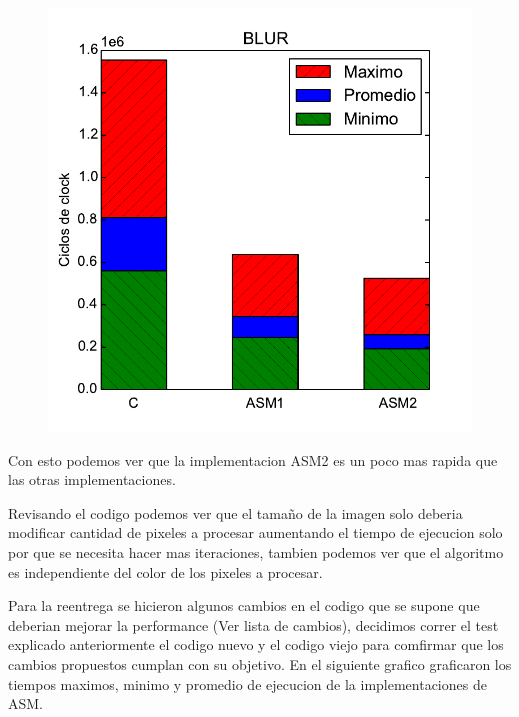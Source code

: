 \begin{figure}[h!]
	\centering
	\includegraphics[scale=0.45]{images/blur_comparation}
\end{figure}

Con esto podemos ver que la implementacion ASM2 es un poco mas rapida que las otras implementaciones.

Revisando el codigo podemos ver que el tamaño de la imagen solo deberia modificar cantidad de pixeles a procesar aumentando el tiempo de ejecucion solo por que se necesita hacer mas iteraciones, tambien podemos ver que el algoritmo es independiente del color de los pixeles a procesar.

Para la reentrega se hicieron algunos cambios en el codigo que se supone que deberian mejorar la performance (Ver lista de cambios), decidimos correr el test explicado anteriormente el codigo nuevo y el codigo viejo para comfirmar que los cambios propuestos cumplan con su objetivo. En el siguiente grafico graficaron los tiempos maximos, minimo y promedio de ejecucion de la implementaciones de ASM.

